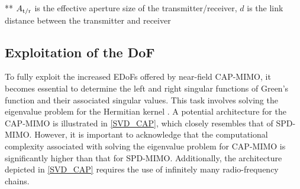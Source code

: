 \documentclass[journal]{IEEEtran}
\theoremstyle{definition}
\begin{document}
\begin{table}[!h]
\begin{threeparttable}
{\begin{tabular}{|ll|r|rrr|}
\end{tabular}}
\begin{tablenotes}
\footnotesize
\item[**] $A_{{\rm{t}}/{\rm{r}}}$ is the effective aperture size of the transmitter/receiver, $d$ is the link distance between the transmitter and receiver
\end{tablenotes}
\end{threeparttable}
\end{table}
\subsection{Exploitation of the DoF}
To fully exploit the increased EDoFs offered by near-field CAP-MIMO, it becomes essential to determine the left and right singular functions of Green's function and their associated singular values. This task involves solving the eigenvalue problem for the Hermitian kernel \cite{Liu2023}. A potential architecture for the CAP-MIMO is illustrated in {\figurename} {\ref{SVD_CAP}}, which closely resembles that of SPD-MIMO. However, it is important to acknowledge that the computational complexity associated with solving the eigenvalue problem for CAP-MIMO is significantly higher than that for SPD-MIMO. Additionally, the architecture depicted in {\figurename} {\ref{SVD_CAP}} requires the use of infinitely many radio-frequency chains.


\end{document}
